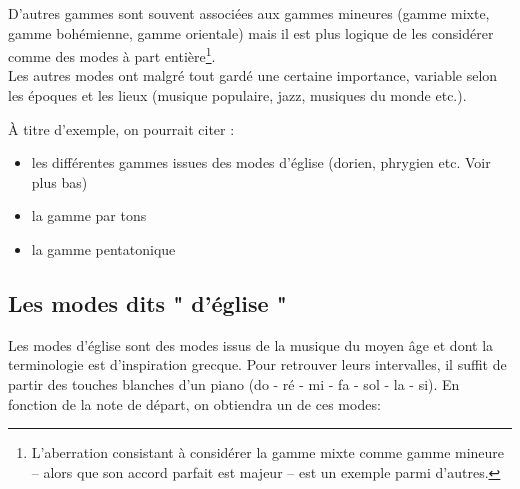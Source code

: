 \documentclass[11pt]{scrreprt}
\begin{document}
\begin{center}
\end{center}

D'autres gammes sont souvent associées aux gammes mineures (gamme mixte, gamme bohémienne, gamme  orientale) mais il est plus logique de les considérer comme des modes à part entière\footnote{L'aberration consistant à considérer la gamme mixte comme gamme mineure -- alors que son accord parfait est majeur -- est un exemple parmi d'autres.}.\\

Les autres modes ont malgré tout gardé une certaine importance, variable selon les époques et les lieux (musique populaire, jazz, musiques du monde etc.).

À titre d'exemple, on pourrait citer :
\begin{itemize}
\item les différentes gammes issues des modes d'église (dorien, phrygien etc. Voir plus bas)
\item la gamme par tons
\item la gamme pentatonique
\end{itemize}

\subsection{Les modes dits " d'église "}
Les modes d'église sont des modes issus de la musique du moyen âge et dont la terminologie est d'inspiration grecque. Pour retrouver leurs intervalles, il suffit de partir des touches blanches d'un piano (do - ré - mi - fa - sol - la - si). En fonction de la note de départ, on obtiendra un de ces modes:
\end{document}
